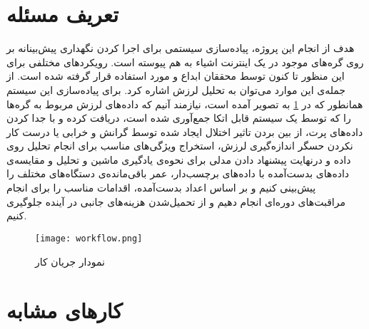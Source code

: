 \section{تعریف مسئله}
هدف از انجام این پروژه، پیاده‌سازی سیستمی برای اجرا کردن نگهداری پیش‌بینانه بر روی گره‌های موجود در یک اینترنت اشیاء به هم پیوسته است. رویکردهای مختلفی برای این منظور تا کنون توسط محققان ابداع و مورد استفاده قرار گرفته شده است. از جمله‌ی این موارد می‌توان به تحلیل لرزش اشاره کرد. برای پیاده‌سازی این سیستم همانطور که در \cref{fig:workflow} به تصویر آمده ‌است، نیازمند آنیم که داده‌های لرزش مربوط به گره‌ها را که توسط یک سیستم قابل اتکا جمع‌آوری شده است، دریافت کرده و با جدا کردن داده‌های پرت، از بین بردن تاثیر اختلال ایجاد شده توسط گرانش و خرابی یا درست‌ کار نکردن حسگر اندازه‌گیری لرزش، استخراج ویژگی‌های مناسب برای انجام تحلیل روی داده و درنهایت پیشنهاد دادن مدلی برای نحوه‌ی یادگیری ماشین و تحلیل و مقایسه‌ی داده‌های بدست‌آمده با داده‌های برچسب‌دار، عمر باقی‌مانده‌ی دستگاه‌های مختلف را پیش‌بینی کنیم و بر اساس اعداد بدست‌آمده، اقدامات مناسب را برای انجام مراقبت‌های دوره‌ای انجام دهیم و از تحمیل‌شدن هزینه‌های جانبی در آینده جلوگیری کنیم.

\begin{figure}[!h]
\centerline{\texttt{[image: workflow.png]}}
\caption{نمودار جریان کار}
\label{fig:workflow}
\end{figure}


\section{کارهای مشابه}
